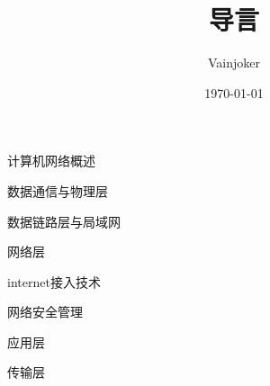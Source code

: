 \documentclass{article}
\title{导言}
\author{Vainjoker}
\date{\today}
\begin{document}
    \maketitle
    
    计算机网络概述

    数据通信与物理层

    数据链路层与局域网

    网络层

    internet接入技术

    网络安全管理

    应用层

    传输层
\end{document}
